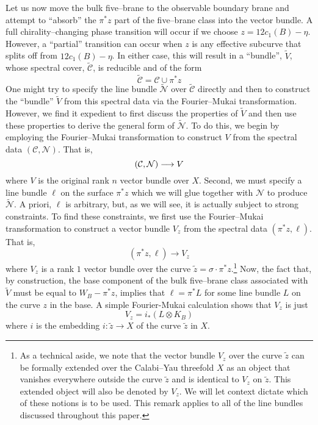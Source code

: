\documentclass[a4paper,12pt]{article}
\numberwithin{equation}{section}
\def\cC{{\mathcal C}}
\def\cN{{\mathcal N}}
\theoremstyle{plain}
\begin{document}
Let us now move the bulk five--brane to the observable 
boundary brane and attempt to ``absorb'' the $\pi^{*}z$ part of the 
five--brane class into the vector bundle. A full chirality--changing phase
transition will occur if we choose $z=12c_{1}(B) - \eta$. However, a
``partial'' transition can occur when $z$ is any effective subcurve that
splits off from $12c_{1}(B) - \eta$. In either case, this will result in a
``bundle'', $\widetilde{V}$, whose spectral cover, $\widetilde{\cC}$, is
reducible and of the form
\begin{equation}
\widetilde{\cC}= \cC\cup \pi^{*}z
\label{eq:59}
\end{equation}
One might try to specify the line bundle $\widetilde{\cN}$ over
$\widetilde{\cC}$ directly and then to construct the ``bundle'' $\widetilde{V}$ from
this spectral data via the Fourier--Mukai transformation. However, we find it
expedient to first discuss the properties of $\widetilde{V}$
and then use these properties to derive the general form of $\widetilde{\cN}$.
To do this, we begin by employing 
the Fourier--Mukai transformation to construct $V$ from the spectral data
$(\cC, \cN)$. That is,
\begin{equation}
({\cal{C}}, \cN) \longrightarrow V
\label{eq:60}
\end{equation}
where $V$ is the original rank $n$ vector bundle over $X$.
Second, we must specify a line bundle $\ell$ on the surface
$\pi^{*}z$ which we will glue together with $\cN$ to produce
$\widetilde{\cN}$. A
priori, $\ell$ is arbitrary, but, as we will see, it is actually subject to
strong constraints. To find these constraints, we first use the Fourier--Mukai
transformation to construct a vector bundle $V_{z}$ from the spectral data 
$(\pi^{*}z,\ell)$. That is,
\begin{equation}
(\pi^{*}z, \ell) \longrightarrow V_{z}
\label{eq:61}
\end{equation}
where $V_{z}$ is a rank $1$ vector bundle over the curve $\tilde{z} =
\sigma\cdot \pi^{*}z$.\footnote{As a technical aside, we note that the vector bundle
$V_{z}$ over the curve $\tilde{z}$ can be formally extended over the Calabi--Yau
threefold $X$ as an object that vanishes everywhere outside the curve
$\tilde{z}$ and is identical to $V_{z}$ on $\tilde{z}$. 
This extended object will also be
denoted by $V_{z}$. We will let context dictate which of these notions is to
be used. This remark applies to all of the line bundles discussed throughout
this paper.} Now, the fact that, by construction, the base component of the
bulk five--brane class associated with $\widetilde{V}$ must be equal to $W_{B} -
\pi^{*}z$, implies that $\ell = \pi^{*}L$ for some line bundle $L$ on the
curve $z$ in the base. A simple Fourier-Mukai calculation shows that
$V_{z}$ is  just
\begin{equation}
V_{z}=i_{*}(L \otimes K_{B})
\label{eq:62}
\end{equation}
where $i$ is the embedding $i : \tilde{z} \rightarrow X$ of the
curve $\tilde{z}$ in $X$.
\end{document}
